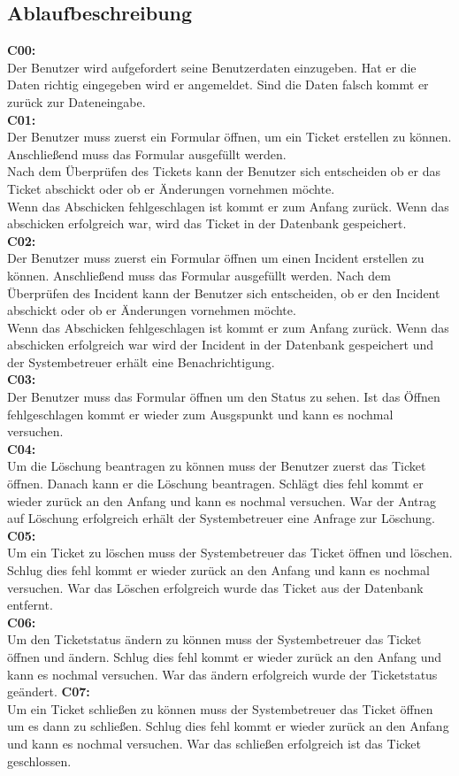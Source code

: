 \subsection{Ablaufbeschreibung}
\textbf{C00:}
\\ 
Der Benutzer wird aufgefordert seine Benutzerdaten einzugeben.
Hat er die Daten richtig eingegeben wird er angemeldet. Sind die Daten falsch kommt er zurück zur Dateneingabe.
\\
\textbf{C01:}
\\
Der Benutzer muss zuerst ein Formular öffnen, um ein Ticket erstellen zu können. Anschließend muss das Formular ausgefüllt werden. 
\\
Nach dem Überprüfen des Tickets kann der Benutzer sich entscheiden ob er das Ticket abschickt oder ob er Änderungen vornehmen möchte. 
\\
Wenn das Abschicken fehlgeschlagen ist kommt er zum Anfang zurück. Wenn das abschicken erfolgreich war, wird das Ticket in der Datenbank gespeichert.
\\
\textbf{C02:}
\\
Der Benutzer muss zuerst ein Formular öffnen um einen Incident erstellen zu können. Anschließend muss das Formular ausgefüllt werden. Nach dem Überprüfen des Incident kann der Benutzer sich entscheiden, ob er den Incident abschickt oder ob er Änderungen vornehmen möchte.
\\
Wenn das Abschicken fehlgeschlagen ist kommt er zum Anfang zurück. Wenn das abschicken erfolgreich war wird der Incident in der Datenbank gespeichert und der Systembetreuer erhält eine Benachrichtigung.
\\
\textbf{C03:}
\\
Der Benutzer muss das Formular öffnen um den Status zu sehen. Ist das Öffnen fehlgeschlagen kommt er wieder zum Ausgspunkt und kann es nochmal versuchen.
\\
\textbf{C04:}
\\
Um die Löschung beantragen zu können muss der Benutzer zuerst das Ticket öffnen. Danach kann er die Löschung beantragen. Schlägt dies fehl kommt er wieder zurück an den Anfang und kann es nochmal versuchen. War der Antrag auf Löschung erfolgreich erhält der Systembetreuer eine Anfrage zur Löschung.
\\
\textbf{C05:}
\\
Um ein Ticket zu löschen muss der Systembetreuer das Ticket öffnen und löschen. Schlug dies fehl kommt er wieder zurück an den Anfang und kann es nochmal versuchen. War das Löschen erfolgreich wurde das Ticket aus der Datenbank entfernt.
\\
\textbf{C06:}
\\
Um den Ticketstatus ändern zu können muss der Systembetreuer das Ticket öffnen und ändern. Schlug dies fehl kommt er wieder zurück an den Anfang und kann es nochmal versuchen. War das ändern erfolgreich wurde der Ticketstatus geändert.
\newpage
\textbf{C07:}
\\
Um ein Ticket schließen zu können muss der Systembetreuer das Ticket öffnen um es dann zu schließen. Schlug dies fehl kommt er wieder zurück an den Anfang und kann es nochmal versuchen. War das schließen erfolgreich ist das Ticket geschlossen.

